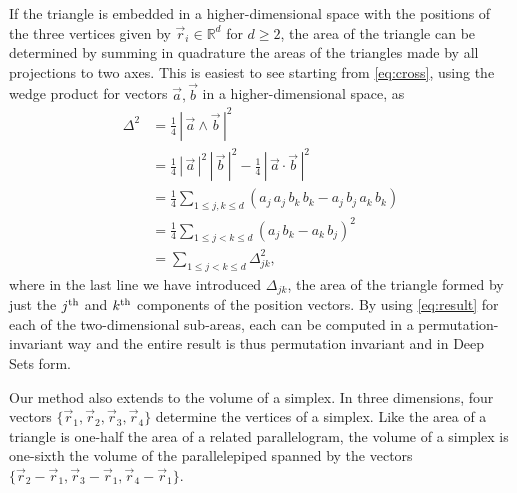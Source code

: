 \documentclass[12pt]{article}
\newcommand{\abs}[1]{|\,{#1}\,|}
\newcommand{\Hogg}[1]{{\color{violet} (Hogg says: #1)}}
\newcommand{\pseudosection}[1]
{}
\begin{document}
If the triangle is embedded in a higher-dimensional space with the positions of the three vertices given by $\vec{r}_i \in \mathbb{R}^{d}$ for $d \geq 2$, the area of the triangle can be determined by summing in quadrature the areas of the triangles made by all projections to two axes. This is easiest to see starting from \eqref{eq:cross}, using the wedge product for vectors $\vec{a}, \vec{b}$ in a higher-dimensional space, as
\begin{align}
    \Delta^2
    &= \frac{1}{4}\, \abs{\vec{a} \wedge \vec{b}}^2 \nonumber\\
    &= \frac{1}{4}\, \abs{\vec{a}}^2 \, \abs{\vec{b}}^2 - \frac{1}{4}\, \abs{\vec{a} \cdot \vec{b}}^2 \nonumber\\
    &= \frac{1}{4} \sum_{1 \leq j, k \leq d} ( a_j \, a_j \, b_k \, b_k - a_j \, b_j \, a_k \, b_k ) \nonumber\\
    &= \frac{1}{4} \sum_{1 \leq j < k \leq d} ( a_j \, b_k - a_k \, b_j)^2 \nonumber\\
    &= \sum_{1 \leq j < k \leq d} \Delta_{jk}^2,
\end{align}
where in the last line we have introduced $\Delta_{jk}$, the area of the triangle formed by just the $j^{\rm th}$ and $k^{\rm th}$ components of the position vectors.
By using \eqref{eq:result} for each of the two-dimensional sub-areas, each can be computed in a permutation-invariant way and the entire result is thus permutation invariant and in Deep Sets form. 

\pseudosection{Generalizations: simplex volume}

Our method also extends to the volume of a simplex. In three dimensions, four vectors $\{ \vec{r}_1, \vec{r}_2, \vec{r}_3, \vec{r}_4 \}$ determine the vertices of a simplex. 
Like the area of a triangle is one-half the area of a related parallelogram, the volume of a simplex is one-sixth the volume of the parallelepiped spanned by the vectors $\{ \vec{r}_2 - \vec{r}_1, \vec{r}_3 - \vec{r}_1, \vec{r}_4 - \vec{r}_1 \}$. 
\end{document}
